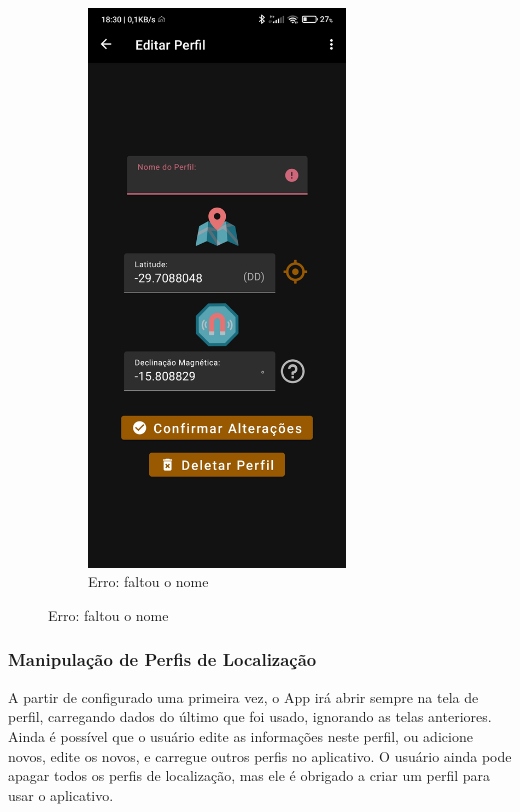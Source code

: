 \begin{figure}[H]
\begin{subfigure}[b]{0.3\textwidth}
		\includegraphics[width=0.75\textwidth]{figuras/desAplicativo/erroescrita}
		\caption{Erro: faltou o nome}
		\label{elev}
	\end{subfigure}
\end{figure}



\subsubsection{Manipulação de Perfis de Localização}
A partir de configurado uma primeira vez, o App irá abrir sempre na tela de perfil, carregando dados do último que foi usado, ignorando as telas anteriores. Ainda é possível que o usuário edite as informações neste perfil, ou adicione novos, edite os novos, e carregue outros perfis no aplicativo. O usuário ainda pode apagar todos os perfis de localização, mas ele é obrigado a criar um perfil para usar o aplicativo.

